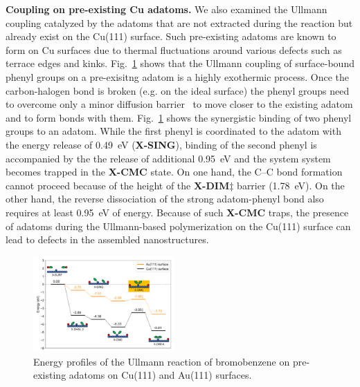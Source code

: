 \documentclass[aps,prb,amsmath,amssymb,11pt]{revtex4-1}
\newcommand{\zhzh}{\color{blue}}
\begin{document}
\textbf{Coupling on pre-existing Cu adatoms.} We also examined the Ullmann coupling catalyzed by the adatoms that are not extracted during the reaction but already exist on the Cu(111) surface. Such pre-existing adatoms are known to form on Cu surfaces due to thermal fluctuations around various defects such as terrace edges and kinks. 
Fig.~\ref{fig:adatomullmann} shows that the Ullmann coupling of surface-bound phenyl groups on a pre-exisitng adatom is a highly exothermic process. Once the carbon-halogen bond is broken (e.g. on the ideal surface) the phenyl groups need to overcome only a minor diffusion barrier~\cite{pccp2010} to move closer to the existing adatom and to form bonds with them. 
Fig.~\ref{fig:adatomullmann} shows the synergistic binding of two phenyl groups to an adatom. While the first phenyl is coordinated to the adatom with the energy release of \SI{0.49}{\electronvolt} {\zhzh (\textbf{X-SING})}, binding of the second phenyl is accompanied by the the release of additional \SI{0.95}{\electronvolt} and the system system becomes trapped in the \textbf{X-CMC} state. On one hand, the C--C bond formation cannot proceed because of the height of the \textbf{X-DIM$\ddagger$} barrier {\zhzh (\SI{1.78}{\electronvolt})}. On the other hand, the reverse dissociation of the strong adatom-phenyl bond also requires at least \SI{0.95}{\electronvolt} of energy. 
Because of such \textbf{X-CMC} traps, the presence of adatoms during the Ullmann-based polymerization on the Cu(111) surface can lead to defects in the assembled nanostructures.

\begin{figure}[bt]
\centering
\includegraphics[width=0.48\textwidth]{Fig/ullmann_adatom.pdf}
\caption{Energy profiles of the Ullmann reaction of bromobenzene on pre-existing adatoms on Cu(111) and Au(111) surfaces.}
\label{fig:adatomullmann}
\end{figure}
\end{document}
